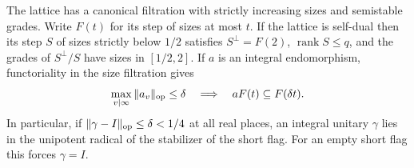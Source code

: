 \begin{lemma}
\label{lem:canonical-short-flag}
The lattice has a canonical filtration with strictly increasing
sizes and semistable grades. Write \(F(t)\) for its step of sizes
at most \(t\). If the lattice is self-dual then its step \(S\) of
sizes strictly below \(1/2\) satisfies \(S^\perp=F(2)\),
\(\operatorname{rank}S\le q\), and the grades of \(S^\perp/S\)
have sizes in \([1/2,2]\).
If \(a\) is an integral endomorphism, functoriality in the size filtration gives 
\[
 \max_{v\mid\infty}\|a_v\|_{\rm op}\le\delta\quad\Longrightarrow\quad aF(t)\subseteq F(\delta t).
\]
 In particular, if
\(\|\gamma-I\|_{\rm op}\le\delta<1/4\) at all real places,
an integral unitary \(\gamma\) lies in the unipotent radical of
the stabilizer of the short flag. For an empty short flag
this forces \(\gamma=I\).
\end{lemma}


